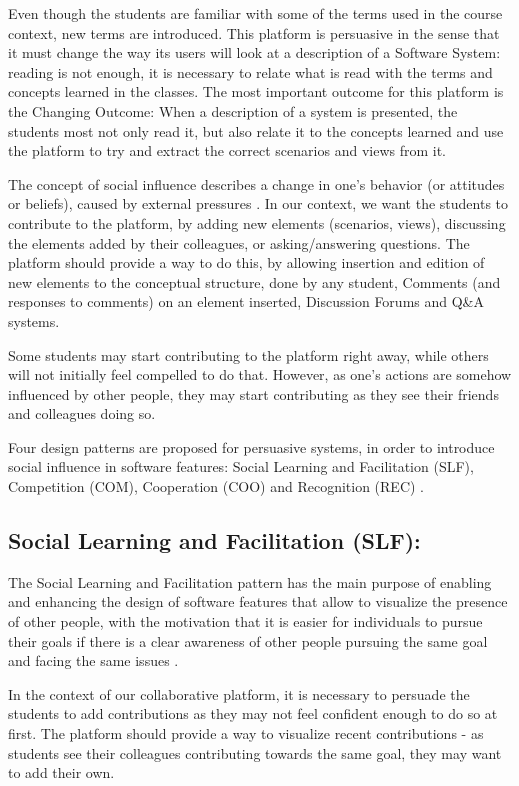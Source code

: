 \documentclass{llncs}
\begin{document}
Even though the students are familiar with some of the terms used in the course context, new terms are introduced. This platform is persuasive in the sense that it must change the way its users will look at a description of a Software System: reading is not enough, it is necessary to relate what is read with the terms and concepts learned in the classes.
The most important outcome for this platform is the Changing Outcome: When a description of a system is presented, the students most not only read it, but also relate it to the concepts learned and use the platform to try and extract the correct scenarios and views from it.

The concept of social influence describes a change in one's behavior (or attitudes or beliefs), caused by external pressures \cite{guadagno2010preference}. In our context, we want the students to contribute to the platform, by adding new elements (scenarios, views), discussing the elements added by their colleagues, or asking/answering questions. 
The platform should provide a way to do this, by allowing insertion and edition of new elements to the conceptual structure, done by any student, Comments (and responses to comments) on an element inserted, Discussion Forums and Q\&A systems.

Some students may start contributing to the platform right away, while others will not initially feel compelled to do that. However, as one's actions are somehow influenced by other people, they may start contributing as they see their friends and colleagues doing so.

Four design patterns are proposed for persuasive systems, in order to introduce social influence in software features: Social Learning and Facilitation (SLF), Competition (COM), Cooperation (COO) and Recognition (REC) \cite{oduor2014persuasive}. 

\subsection{Social Learning and Facilitation (SLF):}

The Social Learning and Facilitation pattern has the main purpose of enabling and enhancing the design of software features that allow to visualize the presence of other people, with the motivation that it is easier for individuals to pursue their goals if there is a clear awareness of other people pursuing the same goal and facing the same issues \cite{oduor2014persuasive}. 

In the context of our collaborative platform, it is necessary to persuade the students to add contributions as they may not feel confident enough to do so at first. The platform should provide a way to visualize recent contributions - as students see their colleagues contributing towards the same goal, they may want to add their own.
\end{document}
